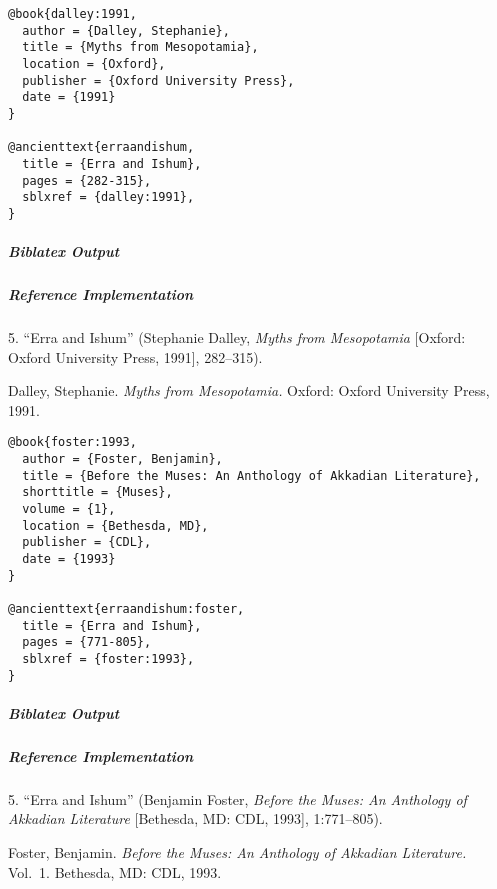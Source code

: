 \documentclass[a4paper]{article}
\newenvironment{biboutput}{%
  \subparagraph{Biblatex Output}
}{\color{black}}
\newenvironment{refimp}{%
  \subparagraph{Reference Implementation}
  \color{reference-colour}
  \rm
}{\par\color{black}}
\begin{document}
\medskip

\begin{lstlisting}
@book{dalley:1991,
  author = {Dalley, Stephanie},
  title = {Myths from Mesopotamia},
  location = {Oxford},
  publisher = {Oxford University Press},
  date = {1991}
}

@ancienttext{erraandishum,
  title = {Erra and Ishum},
  pages = {282-315},
  sblxref = {dalley:1991},
}
\end{lstlisting}

\begin{biboutput}
\end{biboutput}

\begin{refimp}
  \hspace*{\bibindent}5. “Erra and Ishum” (Stephanie Dalley, \emph{Myths from
  Mesopotamia} [Oxford: Oxford University Press, 1991], 282–315).
  
  \hangindent\bibindent Dalley, Stephanie. \emph{Myths from Mesopotamia.}
  Oxford: Oxford University Press, 1991.
\end{refimp}

\medskip

\begin{lstlisting}
@book{foster:1993,
  author = {Foster, Benjamin},
  title = {Before the Muses: An Anthology of Akkadian Literature},
  shorttitle = {Muses},
  volume = {1},
  location = {Bethesda, MD},
  publisher = {CDL},
  date = {1993}
}

@ancienttext{erraandishum:foster,
  title = {Erra and Ishum},
  pages = {771-805},
  sblxref = {foster:1993},
}
\end{lstlisting}

\begin{biboutput}
\end{biboutput}

\begin{refimp}
  \hspace*{\bibindent}5. “Erra and Ishum” (Benjamin Foster, \emph{Before the
  Muses: An Anthology of Akkadian Literature} [Bethesda, MD: CDL, 1993],
  1:771–805).
  
  \hangindent\bibindent Foster, Benjamin. \emph{Before the Muses: An Anthology of
  Akkadian Literature.} Vol.~1. Bethesda, MD: CDL, 1993.
\end{refimp}

\medskip
\end{document}
